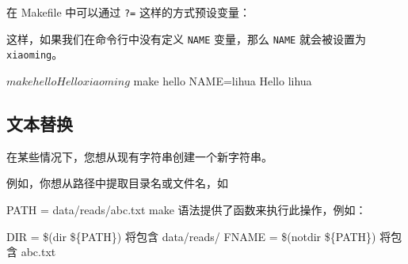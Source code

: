 \documentclass[]{ctexbook}
\newenvironment{Shaded}{\begin{snugshade}}{\end{snugshade}}
\newcommand{\CharTok}[1]{\textcolor[rgb]{0.31,0.60,0.02}{#1}}
\newcommand{\DataTypeTok}[1]{\textcolor[rgb]{0.13,0.29,0.53}{#1}}
\newcommand{\DecValTok}[1]{\textcolor[rgb]{0.00,0.00,0.81}{#1}}
\newcommand{\ExtensionTok}[1]{#1}
\newcommand{\NormalTok}[1]{#1}
\newcommand{\StringTok}[1]{\textcolor[rgb]{0.31,0.60,0.02}{#1}}
\begin{document}
在 Makefile 中可以通过 \texttt{?=} 这样的方式预设变量：

\begin{Shaded}
\end{Shaded}

这样，如果我们在命令行中没有定义 \texttt{NAME} 变量，那么 \texttt{NAME} 就会被设置为 \texttt{xiaoming}。

\begin{Shaded}
\begin{Highlighting}[]
\ExtensionTok{$}\NormalTok{ make hello}
\ExtensionTok{Hello}\NormalTok{ xiaoming}

\ExtensionTok{$}\NormalTok{ make hello NAME=lihua}
\ExtensionTok{Hello}\NormalTok{ lihua}
\end{Highlighting}
\end{Shaded}

\subsection{文本替换}\label{ux6587ux672cux66ffux6362}

在某些情况下，您想从现有字符串创建一个新字符串。

例如，你想从路径中提取目录名或文件名，如

PATH = data/reads/abc.txt
make 语法提供了函数来执行此操作，例如：

DIR = \$(dir \$\{PATH\}) 将包含 data/reads/
FNAME = \$(notdir \$\{PATH\}) 将包含 abc.txt
\end{document}
